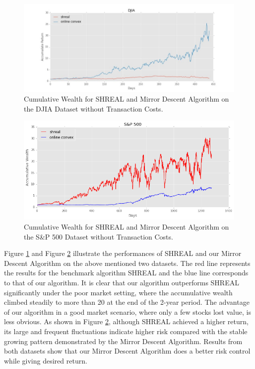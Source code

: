 \begin{figure}[!h]
\centering
\includegraphics[width=1.0\columnwidth]{DJIA} 
\caption{Cumulative Wealth for SHREAL and Mirror Descent Algorithm on the DJIA Dataset without Transaction Costs.}
\label{DJIA}
\end{figure}

\begin{figure}[!h]
\centering
\includegraphics[width=0.85\columnwidth]{S_P500} 
\caption{Cumulative Wealth for SHREAL and Mirror Descent Algorithm on the S\&P 500 Dataset without Transaction Costs.}
\label{S_P500}
\end{figure}

\noindent Figure \ref{DJIA} and Figure \ref{S_P500} illustrate the performances of SHREAL and our Mirror Descent Algorithm on the above mentioned two datasets. The red line represents the results for the benchmark algorithm SHREAL and the blue line corresponds to that of our algorithm. It is clear that our algorithm outperforms SHREAL significantly under the poor market setting, where the accumulative wealth climbed steadily to more than 20 at the end of the 2-year period. The advantage of our algorithm in a good market scenario, where only a few stocks lost value, is less obvious. As shown in Figure \ref{S_P500}, although SHREAL achieved a higher return, its large and frequent fluctuations indicate higher risk compared with the stable growing pattern demonstrated by the Mirror Descent Algorithm. Results from both datasets show that our Mirror Descent Algorithm does a better risk control while giving desired return. 

